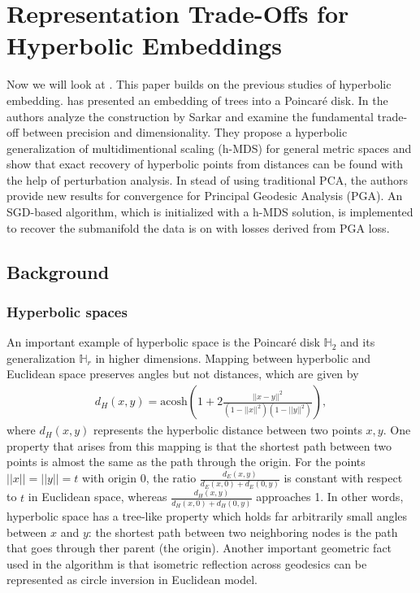\section{Representation Trade-Offs for Hyperbolic Embeddings}
Now we will look at \cite{tradeoff}. This paper builds on the previous studies of hyperbolic embedding. 
\cite{Sarkar} has presented an embedding of trees into a Poincar\'e disk. In \cite{tradeoff} the authors analyze the construction by Sarkar and examine the fundamental trade-off between precision and dimensionality. They propose a hyperbolic generalization of multidimentional scaling (h-MDS) for general metric spaces and show that exact recovery of hyperbolic points from distances can be found with the help of perturbation analysis. In stead of using traditional PCA, the authors provide new results for convergence for Principal Geodesic Analysis (PGA).  An SGD-based algorithm, which is initialized with a h-MDS solution, is implemented to recover the submanifold the data is on with losses derived from PGA loss. 


\subsection{Background}
\subsubsection{Hyperbolic spaces}

An important example of hyperbolic space is the Poincar\'e disk $\mathbb{H}_2$ and its generalization $\mathbb{H}_r$ in higher dimensions. Mapping between hyperbolic and Euclidean space preserves angles but not distances, which are given by
\begin{align*}
    d_H(x, y) = \text{acosh}(1 + 2 \frac{||x-y||^2}{(1-||x||^2)(1 - ||y||^2)}),
\end{align*}
where $d_H(x, y)$ represents the hyperbolic distance between two points $x, y$. One property that arises from this mapping is that the shortest path between two points is almost the same as the path through the origin. For the points $||x||=||y|| = t$ with origin $0$, the ratio $\frac{d_E(x, y)}{d_E(x, 0) + d_E(0, y)}$ is constant with respect to $t$ in Euclidean space, whereas $\frac{d_H(x, y)}{d_H(x, 0) + d_H(0, y)}$ approaches 1. In other words, hyperbolic space has a tree-like property which holds far arbitrarily small angles between $x$ and $y$: the shortest path between two neighboring nodes is the path that goes through ther parent (the origin). Another important geometric fact used in the algorithm is that isometric reflection across geodesics can be represented as circle inversion in Euclidean model. 

